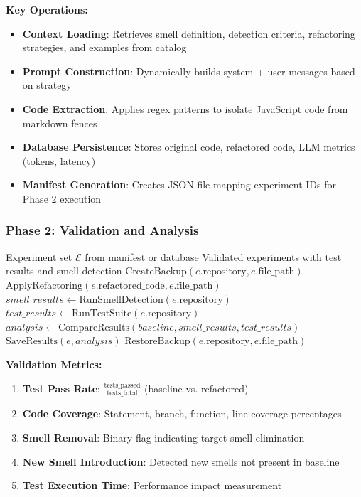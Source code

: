 \documentclass[12pt]{article}
\begin{document}
\textbf{Key Operations:}
\begin{itemize}
    \item \textbf{Context Loading}: Retrieves smell definition, detection criteria, refactoring strategies, and examples from catalog
    \item \textbf{Prompt Construction}: Dynamically builds system + user messages based on strategy
    \item \textbf{Code Extraction}: Applies regex patterns to isolate JavaScript code from markdown fences
    \item \textbf{Database Persistence}: Stores original code, refactored code, LLM metrics (tokens, latency)
    \item \textbf{Manifest Generation}: Creates JSON file mapping experiment IDs for Phase 2 execution
\end{itemize}

\subsubsection{Phase 2: Validation and Analysis}

\begin{algorithm}
\caption{Batch Execution and Validation Phase}
\label{alg:execute-phase}
\begin{algorithmic}[1]
\Require Experiment set $\mathcal{E}$ from manifest or database
\Ensure Validated experiments with test results and smell detection
    \State $\text{CreateBackup}(e.\text{repository}, e.\text{file\_path})$
    \State $\text{ApplyRefactoring}(e.\text{refactored\_code}, e.\text{file\_path})$
    \State $smell\_results \gets \text{RunSmellDetection}(e.\text{repository})$
    \State $test\_results \gets \text{RunTestSuite}(e.\text{repository})$
    \State $analysis \gets \text{CompareResults}(baseline, smell\_results, test\_results)$
    \State $\text{SaveResults}(e, analysis)$ 
    \State $\text{RestoreBackup}(e.\text{repository}, e.\text{file\_path})$
\EndFor
\end{algorithmic}
\end{algorithm}

\textbf{Validation Metrics:}
\begin{enumerate}
    \item \textbf{Test Pass Rate}: $\frac{\text{tests\_passed}}{\text{tests\_total}}$ (baseline vs. refactored)
    \item \textbf{Code Coverage}: Statement, branch, function, line coverage percentages
    \item \textbf{Smell Removal}: Binary flag indicating target smell elimination
    \item \textbf{New Smell Introduction}: Detected new smells not present in baseline
    \item \textbf{Test Execution Time}: Performance impact measurement
\end{enumerate}
\end{document}
